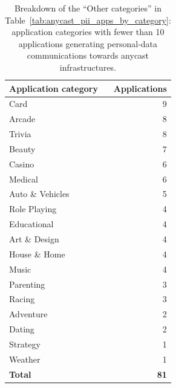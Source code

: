 \begin{table}[ht]
    \centering
    \small
    \caption{Breakdown of the ``Other categories'' in Table~\ref{tab:anycast_pii_apps_by_category}: application categories with fewer than 10 applications generating personal-data communications towards anycast infrastructures.}
    \label{tab:anycast_pii_apps_by_category_less_ten_repetitions}
    \begin{tabular}{lr}
        \toprule
        \textbf{Application category} & \textbf{Applications} \\
        \midrule
        Card & 9 \\
        Arcade & 8 \\
        Trivia & 8 \\
        Beauty & 7 \\
        Casino & 6 \\
        Medical & 6 \\
        Auto \& Vehicles & 5 \\
        Role Playing & 4 \\
        Educational & 4 \\
        Art \& Design & 4 \\
        House \& Home & 4 \\
        Music & 4 \\
        Parenting & 3 \\
        Racing & 3 \\
        Adventure & 2 \\
        Dating & 2 \\
        Strategy & 1 \\
        Weather & 1 \\
        \midrule
        \textbf{Total} & \textbf{81} \\
        \bottomrule
    \end{tabular}
\end{table}

